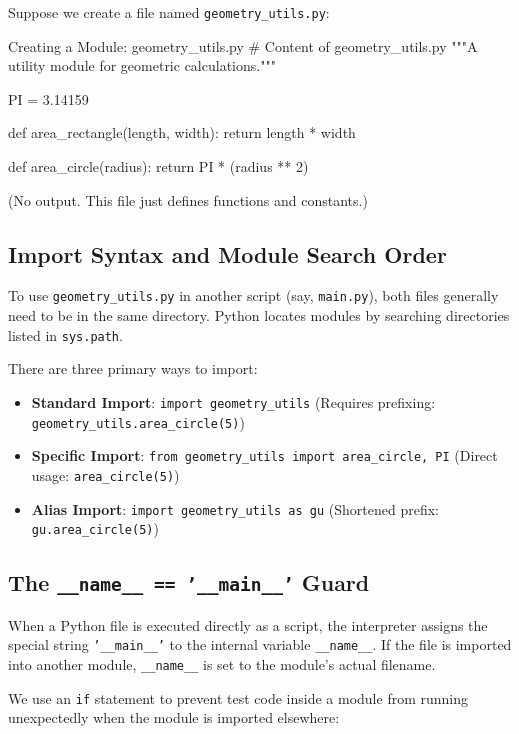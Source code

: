 Suppose we create a file named \texttt{geometry\_utils.py}:

\begin{pythoncode}{Creating a Module: geometry\_utils.py}
# Content of geometry_utils.py
"""A utility module for geometric calculations."""

PI = 3.14159

def area_rectangle(length, width):
    return length * width

def area_circle(radius):
    return PI * (radius ** 2)
\end{pythoncode}

\begin{outputbox}
(No output. This file just defines functions and constants.)
\end{outputbox}

\subsection{Import Syntax and Module Search Order}
To use \texttt{geometry\_utils.py} in another script (say, \texttt{main.py}), both files generally need to be in the same directory. Python locates modules by searching directories listed in \texttt{sys.path}. 

There are three primary ways to import:
\begin{itemize}
    \item \textbf{Standard Import}: \texttt{import geometry\_utils} (Requires prefixing: \texttt{geometry\_utils.area\_circle(5)})
    \item \textbf{Specific Import}: \texttt{from geometry\_utils import area\_circle, PI} (Direct usage: \texttt{area\_circle(5)})
    \item \textbf{Alias Import}: \texttt{import geometry\_utils as gu} (Shortened prefix: \texttt{gu.area\_circle(5)})
\end{itemize}

\subsection{The \texttt{\_\_name\_\_ == '\_\_main\_\_'} Guard}
When a Python file is executed directly as a script, the interpreter assigns the special string \texttt{'\_\_main\_\_'} to the internal variable \texttt{\_\_name\_\_}. If the file is imported into another module, \texttt{\_\_name\_\_} is set to the module's actual filename.

We use an \texttt{if} statement to prevent test code inside a module from running unexpectedly when the module is imported elsewhere:

